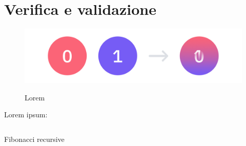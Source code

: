 \chapter{Verifica e validazione}
\label{chap:verifica-validazione}

\begin{figure}[H]
    \centering
    \includegraphics[alt={Testo alternativo dell'immagine}, width=1\columnwidth]{img/quantum_superposition.jpeg}
    \caption{Lorem}
    \label{fig:enter-label}
\end{figure}

\lipsum[1-2]

Lorem ipsum:
\begin{listing}[H]
\inputminted{python}{code/example.py}
\caption{Fibonacci recursive}
\label{listing:py_fibo}
\end{listing}

\lipsum[1]

\newpage